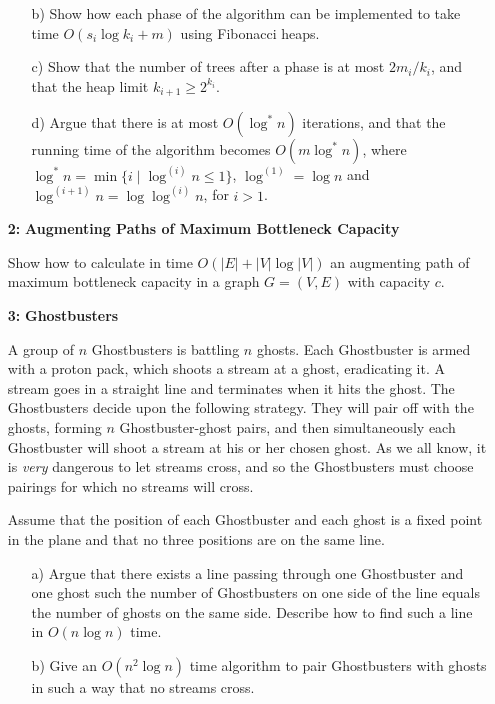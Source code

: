 \documentclass[11pt]{article}
\begin{document}
\begin{itemize}
  \begin{itemize}
  \item[b)] Show how each phase of the algorithm can be implemented to
    take time $O(s_i\log k_i+m)$ using Fibonacci heaps.
  \item[c)] Show that the number of trees after a phase is at most
    $2{m_i}/{k_i}$, and that the heap limit $k_{i+1}\geq 2^{k_i}$.
  \item[d)] Argue that there is at most $O(\log^* n)$ iterations, and
    that the running time of the algorithm becomes $O(m\log^* n)$,
    where $\log^* n=\min \{ i \mid \log^{(i)} n\leq 1 \}$, $\log^{(1)}=\log n$ 
    and $\log^{(i+1)} n=\log\log^{(i)} n$, for $i>1$.
  \end{itemize}

\item[\bf 2:] {\bf Augmenting Paths of Maximum Bottleneck Capacity}
  
  Show how to calculate in time $O(|E|+|V|\log|V|)$ an augmenting path of maximum
  bottleneck capacity in a graph $G=(V,E)$ with capacity $c$.
  
\item[\bf 3:] {\bf Ghostbusters}

  A group of $n$ Ghostbusters is battling $n$ ghosts. Each
  Ghostbuster is armed with a proton pack, which shoots a stream at a
  ghost, eradicating it. A stream goes in a straight line and
  terminates when it hits the ghost. The Ghostbusters decide upon the
  following strategy. They will pair off with the ghosts, forming $n$
  Ghostbuster-ghost pairs, and then simultaneously each Ghostbuster
  will shoot a stream at his or her chosen ghost. As we all know, it
  is \emph{very} dangerous to let streams cross, and so the
  Ghostbusters must choose pairings for which no streams will cross.
  
  Assume that the position of each Ghostbuster and each ghost is a
  fixed point in the plane and that no three positions are on the same
  line.
  \begin{itemize}
  \item[a)] Argue that there exists a line passing through one
    Ghostbuster and one ghost such the number of Ghostbusters on one
    side of the line equals the number of ghosts on the same side.
    Describe how to find such a line in $O(n\log n)$ time.
  \item[b)] Give an $O(n^2\log n)$ time algorithm to pair Ghostbusters
    with ghosts in such a way that no streams cross.
  \end{itemize}



\end{itemize}
\end{document}
